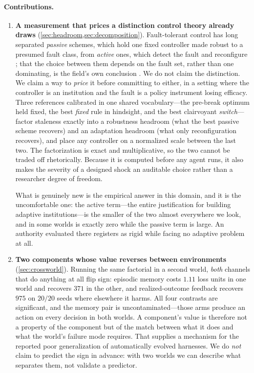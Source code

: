 \documentclass[11pt]{article}
\begin{document}
\paragraph{Contributions.}
\begin{enumerate}[leftmargin=1.4em]
\item \textbf{A measurement that prices a distinction control theory already draws}
(\cref{sec:headroom,sec:decomposition}). Fault-tolerant control has long separated \emph{passive}
schemes, which hold one fixed controller made robust to a presumed fault class, from \emph{active}
ones, which detect the fault and reconfigure \citep{zhang2008reconfigurable}; that the choice between
them depends on the fault set, rather than one dominating, is the field's own conclusion
\citep{jiang2012comparative}. We do not claim the distinction. We claim a way to \emph{price} it
before committing to either, in a setting where the controller is an institution and the fault is a
policy instrument losing efficacy. Three references calibrated in one shared vocabulary---the
pre-break optimum held fixed, the best \emph{fixed} rule in hindsight, and the best clairvoyant
\emph{switch}---factor staleness exactly into a robustness headroom (what the best passive scheme
recovers) and an adaptation headroom (what only reconfiguration recovers), and place any controller
on a normalized scale between the last two. The factorization is exact and multiplicative, so the two
cannot be traded off rhetorically. Because it is computed before any agent runs, it also makes the
severity of a designed shock an auditable choice rather than a researcher degree of freedom.

What is genuinely new is the empirical answer in this domain, and it is the uncomfortable one: the
active term---the entire justification for building adaptive institutions---is the smaller of the two
almost everywhere we look, and in some worlds is exactly zero while the passive term is large. An
authority evaluated there registers as rigid while facing no adaptive problem at all.

\item \textbf{Two components whose value reverses between environments}
(\cref{sec:crossworld}). Running the same factorial in a second world, \emph{both} channels that do
anything at all flip sign: episodic memory costs $1.11$ loss units in one world and recovers $371$ in
the other, and realized-outcome feedback recovers $975$ on $20/20$ seeds where elsewhere it harms.
All four contrasts are significant, and the memory pair is uncontaminated---those arms produce an
action on every decision in both worlds. A component's value is therefore not a property of the
component but of the match between what it does and what the world's failure mode requires. That
supplies a mechanism for the reported poor generalization of automatically evolved harnesses. We do
\emph{not} claim to predict the sign in advance: with two worlds we can describe what separates them,
not validate a predictor.


\end{enumerate}
\end{document}
